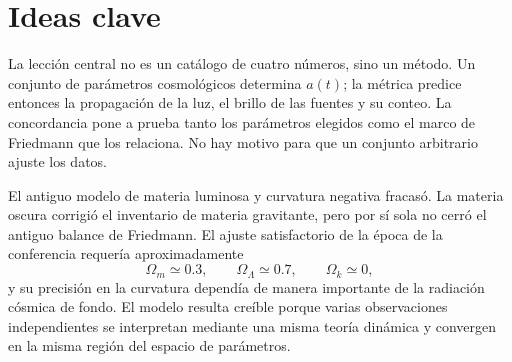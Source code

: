\section{Ideas clave}

La lección central no es un catálogo de cuatro números, sino un método. Un conjunto de parámetros cosmológicos determina \(a(t)\); la métrica predice entonces la propagación de la luz, el brillo de las fuentes y su conteo. La concordancia pone a prueba tanto los parámetros elegidos como el marco de Friedmann que los relaciona. No hay motivo para que un conjunto arbitrario ajuste los datos.

El antiguo modelo de materia luminosa y curvatura negativa fracasó. La materia oscura corrigió el inventario de materia gravitante, pero por sí sola no cerró el antiguo balance de Friedmann. El ajuste satisfactorio de la época de la conferencia requería aproximadamente
\begin{equation}
\Omega_m\simeq0.3,
\qquad
\Omega_\Lambda\simeq0.7,
\qquad
\Omega_k\simeq0,
\end{equation}
y su precisión en la curvatura dependía de manera importante de la radiación cósmica de fondo. El modelo resulta creíble porque varias observaciones independientes se interpretan mediante una misma teoría dinámica y convergen en la misma región del espacio de parámetros.
